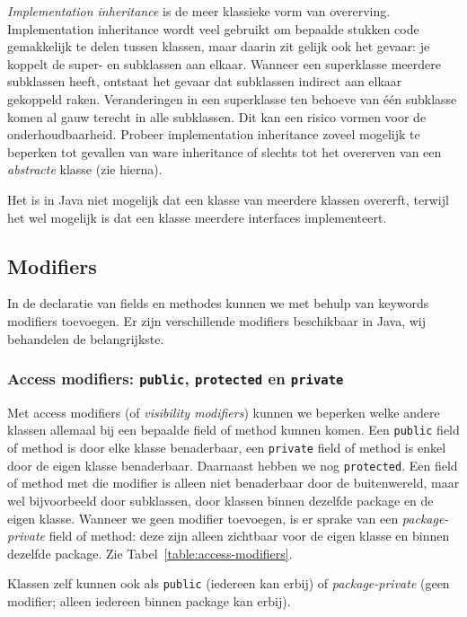 \documentclass[dutch,a4paper,12pt,doubleside]{book}
\begin{document}
\textit{Implementation inheritance} is de meer klassieke vorm van overerving.
Implementation inheritance wordt veel gebruikt om bepaalde stukken code gemakkelijk te delen tussen klassen,
maar daarin zit gelijk ook het gevaar: je koppelt de super- en subklassen aan elkaar.
Wanneer een superklasse meerdere subklassen heeft, ontstaat het gevaar dat subklassen indirect 
aan elkaar gekoppeld raken. Veranderingen in een superklasse ten behoeve van één subklasse 
komen al gauw terecht in alle subklassen. Dit kan een risico vormen voor de onderhoudbaarheid.
Probeer implementation inheritance zoveel mogelijk te beperken tot gevallen van ware inheritance 
of slechts tot het overerven van een \textit{abstracte} klasse (zie hierna).

Het is in Java niet mogelijk dat een klasse van meerdere klassen overerft, 
terwijl het wel mogelijk is dat een klasse meerdere interfaces implementeert.

\subsection{Modifiers}
In de declaratie van fields en methodes kunnen we met behulp van keywords modifiers toevoegen.
Er zijn verschillende modifiers beschikbaar in Java, wij behandelen de belangrijkste. 

\subsubsection{Access modifiers: \texttt{public}, \texttt{protected} en \texttt{private}}
Met access modifiers (of \textit{visibility modifiers}) kunnen we 
beperken welke andere klassen allemaal bij een bepaalde field of method kunnen komen.
Een \texttt{public} field of method is door elke klasse benaderbaar, 
een \texttt{private} field of method is enkel door de eigen klasse benaderbaar.
Daarnaast hebben we nog \texttt{protected}. Een field of method met die modifier 
is alleen niet benaderbaar door de buitenwereld, maar wel bijvoorbeeld door 
subklassen, door klassen binnen dezelfde package en de eigen klasse. 
Wanneer we geen modifier toevoegen, is er sprake van een \textit{package-private}
field of method: deze zijn alleen zichtbaar voor de eigen klasse en binnen
dezelfde package. Zie Tabel~\ref{table:access-modifiers}.

Klassen zelf kunnen ook als \texttt{public} (iedereen kan erbij) 
of \textit{package-private} (geen modifier; alleen iedereen binnen package kan erbij).
\end{document}
